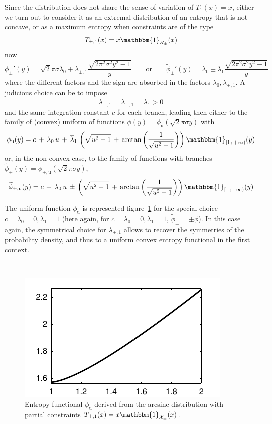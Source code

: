 \documentclass[english,sort&compress]{elsarticle}
\theoremstyle{definition}
\theoremstyle{plain}
\theoremstyle{plain}
\def\X{\mathcal{X}}
\def\un{\mathbbm{1}}
\begin{document}
Since the  distribution does not share the  sense of variation of  $T_1(x) = x$,
either we turn out to consider it as an extremal distribution of an entropy that
is not concave, or as a maximum entropy when constraints are of the type
%
\[
T_{\pm,1}(x) = x \un_{\X_\pm}(x)
\]
%
now 
%
\[
\phi_\pm'(y) = \sqrt2 \pi \sigma \lambda_0 + \lambda_{\pm,1} \frac{\sqrt{2 \pi^2
    \sigma^2  y^2 -  1}}{y} \qquad  \mbox{or} \qquad  \widetilde{\phi}_\pm'(y) =
\lambda_0 \pm \lambda_1 \frac{\sqrt{2 \pi^2 \sigma^2 y^2 - 1}}{y}
\]
%
where  the  different  factors  and  the  sign  are  absorbed  in  the  factors
$\lambda_0, \lambda_{\pm,1}$. A judicious choice can be to impose
%
\[
\lambda_{-,1} = \lambda_{+,1} = \overline{\lambda}_1 > 0
\]
%
and the  same integration constant $c$  for each branch, leading  then either to
the family of (convex)  uniform of functions $\phi(y) = \phi_{\mathrm{u}}(\sqrt2
\pi \sigma y)$ with
%
\[
\phi_{\mathrm{u}}(y) = c \, + \,  \lambda_0 \, u \, + \, \overline{\lambda}_1 \,
\left( \sqrt{u^2  - 1}  \, + \,  \arctan\left( \frac{1}{\sqrt{u^2 -  1}} \right)
\right) \un_{\left[1 \, ; \, +\infty \right)}(y)
\]
%
or,  in  the  non-convex  case,   to  the  family  of  functions  with  branches
$\widetilde{\phi}_{\pm}(y) = \widetilde{\phi}_{\pm,\mathrm{u}}(\sqrt2 \pi \sigma
y)$,
%
\[
\widetilde{\phi}_{\pm,\mathrm{u}}(y) = c \, + \, \lambda_0 \, u \, \pm \, \left(
  \sqrt{u^2 - 1} \, +  \, \arctan\left( \frac{1}{\sqrt{u^2 - 1}} \right) \right)
\un_{\left[ 1 \, ; \, +\infty \right)}(y)
\]


The      uniform      function      $\phi_{\mathrm{u}}$      is      represented
figure~\ref{fig:Entropy-arcsin}  for the  special  choice $c  =  \lambda_0 =  0,
\overline{\lambda}_1 = 1$  (here again, for $c = \lambda_0 =  0, \lambda_1 = 1$,
$\widetilde{\phi}_\pm = \pm \phi$).  In  this case again, the symmetrical choice
for  $\lambda_{\pm,1}$  allows to  recover  the  symmetries  of the  probability
density, and thus to a uniform convex entropy functional in the first context.

\
 
\begin{figure}[htbp]
\centerline{\includegraphics[width=.43\textwidth]{PDF/MaxEnt_ArcsineLaw}}
\caption{Entropy  functional   $\phi_{\mathrm{u}}$  derived  from   the  arcsine
  distribution with partial constraints $T_{\pm,1}(x) = x \un_{\X_\pm}(x)$.}
\label{fig:Entropy-arcsin}
\end{figure}
\end{document}
